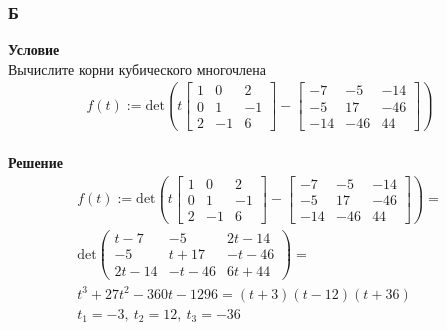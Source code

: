 		\subsubsection*{\textbf{Б}}
		\textbf{Условие}\\
		Вычислите корни кубического многочлена
		\begin{gather*}
			f(t):=
			\text{det}
			\left(t
			\begin{bmatrix}
				1 & 0 & 2 \\
				0 & 1 & -1 \\
				2 & -1 & 6
			\end{bmatrix}
			-
			\begin{bmatrix}
				-7 & -5 & -14 \\
				-5 & 17 & -46 \\
				-14 & -46 & 44
			\end{bmatrix}
			\right)
		\end{gather*}
		\\
		\textbf{Решение}\\
		\begin{gather*}
			f(t):=
			\text{det}
			\left(t
			\begin{bmatrix}
				1 & 0 & 2 \\
				0 & 1 & -1 \\
				2 & -1 & 6
			\end{bmatrix}
			-
			\begin{bmatrix}
				-7 & -5 & -14 \\
				-5 & 17 & -46 \\
				-14 & -46 & 44
			\end{bmatrix}
			\right)
			=\\
			\text{det}
			\begin{pmatrix}
				t-7 & -5 & 2t-14 \\
				-5 & t+17 & -t-46 \\
				2t-14 & -t-46 & 6t+44
			\end{pmatrix}
			= \\
			t^3 + 27t^2 - 360t - 1296
			=
			(t + 3)(t - 12)(t + 36)\\
			t_1 = -3,\ t_2 = 12,\ t_3 = -36			
		\end{gather*}
		